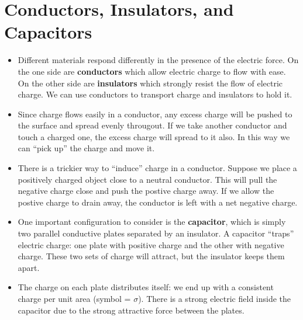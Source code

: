 \documentclass{article}
\begin{document}
\newpage
\section{Conductors, Insulators, and Capacitors}




%
\begin{itemize}

\item Different materials respond differently in the presence of the electric force. On the one side are \textbf{conductors} which allow electric charge to flow with ease. On the other side are \textbf{insulators} which strongly resist the flow of electric charge. We can use conductors to transport charge and insulators to hold it.

\item Since charge flows easily in a conductor, any excess charge will be pushed to the surface and spread evenly througout. If we take another conductor and touch a charged one, the excess charge will spread to it also. In this way we can ``pick up'' the charge and move it.

\item There is a trickier way to ``induce'' charge in a conductor. Suppose we place a positively charged object close to a neutral conductor. This will pull the negative charge close and push the postive charge away. If we allow the postive charge to drain away, the conductor is left with a net negative charge.

\item One important configuration to consider is the \textbf{capacitor}, which is simply two parallel conductive plates separated by an insulator. A capacitor ``traps'' electric charge: one plate with positive charge and the other with negative charge. These two sets of charge will attract, but the insulator keeps them apart.

\item The charge on each plate distributes itself: we end up with a consistent charge per unit area (symbol = $\sigma$). There is a strong electric field inside the capacitor due to the strong attractive force between the plates.


\end{itemize}
\end{document}
